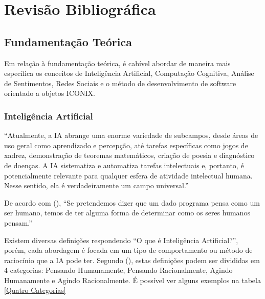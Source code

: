\documentclass[
	12pt,				%
	openright,			%
	oneside,			%
	a4paper,			%
	english,			%
	spanish,			%
	brazil				%
	]{abntex2}
\begin{document}
\chapter{Revisão Bibliográfica}				


\section{Fundamentação Teórica}
	
	Em relação à fundamentação teórica, é cabível abordar de maneira mais específica os conceitos de Inteligência Artificial, Computação Cognitiva, Análise de Sentimentos, Redes Sociais e o método de desenvolvimento de software orientado a objetos ICONIX.

	\subsection{Inteligência Artificial}	
	\begin{citacao} ``Atualmente, a IA abrange uma enorme variedade de subcampos, desde áreas de uso geral como aprendizado e percepção, até tarefas específicas como jogos de xadrez, demonstração de teoremas matemáticos, criação de poesia e diagnóstico de doenças. A IA sistematiza e automatiza tarefas intelectuais e, portanto, é potencialmente relevante para qualquer esfera de atividade intelectual humana. Nesse sentido, ela é verdadeiramente um campo universal.'' \cite{norvig3rd}
	\end{citacao}

	De acordo com  (\citeyear{norvig3rd}), ``Se pretendemos dizer que um dado programa pensa como um ser humano, temos de ter alguma forma de determinar como os seres humanos pensam.''
	
	Existem diversas definições respondendo ``O que é Inteligência Artificial?'', porém, cada abordagem é focada em um tipo de comportamento ou método de raciocínio que a IA pode ter. Segundo  (\citeyear{norvig3rd}), estas definições podem ser divididas em 4 categorias: Pensando Humanamente, Pensando Racionalmente, Agindo Humanamente e Agindo Racionalmente. É possível ver alguns exemplos na tabela \ref{Quatro Categorias}
	
\end{document}

